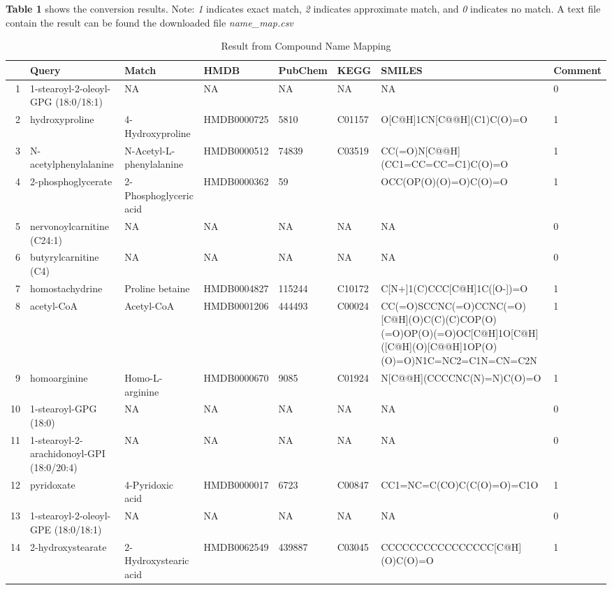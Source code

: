 \documentclass[a4paper]{article}
\begin{document}
\textbf{Table 1} shows the conversion results. Note: \textit{1} indicates exact match, \textit{2}
indicates approximate match, and \textit{0} indicates no match. A text file contain the result can be
found the downloaded file \textit{name\_map.csv}


\begingroup\scriptsize
\begin{longtable}{rlllllll}
\caption{Result from Compound Name Mapping} \\ 
  \hline
 & Query & Match & HMDB & PubChem & KEGG & SMILES & Comment \\ 
  \hline
1 & 1-stearoyl-2-oleoyl-GPG (18:0/18:1) & NA & NA & NA & NA & NA & 0 \\ 
  2 & hydroxyproline & 4-Hydroxyproline & HMDB0000725 & 5810 & C01157 & O[C@H]1CN[C@@H](C1)C(O)=O & 1 \\ 
  3 & N-acetylphenylalanine & N-Acetyl-L-phenylalanine & HMDB0000512 & 74839 & C03519 & CC(=O)N[C@@H](CC1=CC=CC=C1)C(O)=O & 1 \\ 
  4 & 2-phosphoglycerate & 2-Phosphoglyceric acid & HMDB0000362 & 59 &  & OCC(OP(O)(O)=O)C(O)=O & 1 \\ 
  5 & nervonoylcarnitine (C24:1) & NA & NA & NA & NA & NA & 0 \\ 
  6 & butyrylcarnitine (C4) & NA & NA & NA & NA & NA & 0 \\ 
  7 & homostachydrine & Proline betaine & HMDB0004827 & 115244 & C10172 & C[N+]1(C)CCC[C@H]1C([O-])=O & 1 \\ 
  8 & acetyl-CoA & Acetyl-CoA & HMDB0001206 & 444493 & C00024 & CC(=O)SCCNC(=O)CCNC(=O)[C@H](O)C(C)(C)COP(O)(=O)OP(O)(=O)OC[C@H]1O[C@H]([C@H](O)[C@@H]1OP(O)(O)=O)N1C=NC2=C1N=CN=C2N & 1 \\ 
  9 & homoarginine & Homo-L-arginine & HMDB0000670 & 9085 & C01924 & N[C@@H](CCCCNC(N)=N)C(O)=O & 1 \\ 
  10 & 1-stearoyl-GPG (18:0) & NA & NA & NA & NA & NA & 0 \\ 
  11 & 1-stearoyl-2-arachidonoyl-GPI (18:0/20:4) & NA & NA & NA & NA & NA & 0 \\ 
  12 & pyridoxate & 4-Pyridoxic acid & HMDB0000017 & 6723 & C00847 & CC1=NC=C(CO)C(C(O)=O)=C1O & 1 \\ 
  13 & 1-stearoyl-2-oleoyl-GPE (18:0/18:1) & NA & NA & NA & NA & NA & 0 \\ 
  14 & 2-hydroxystearate & 2-Hydroxystearic acid & HMDB0062549 & 439887 & C03045 & CCCCCCCCCCCCCCCC[C@H](O)C(O)=O & 1 \\ 

\end{longtable}
\end{document}
